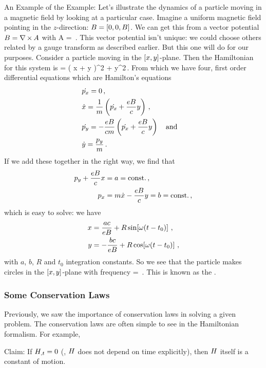 An Example of the Example: Let's illustrate the dynamics of a particle moving in a magnetic field by looking at a particular case. Imagine a uniform magnetic field pointing in the $z$-direction: $B = \left[{0,0,B}\right]$. We can get this from a vector potential $B = \nabla\operatorname{\times} A$ with
\beq
A = \,.
\eeq
This vector potential isn't unique: we could choose others related by a gauge transform as described earlier. But this one will do for our purposes. Consider a particle moving in the $\left[{x,y}\right]$-plane. Then the Hamiltonian for this system is
\beq
\ham = \left( \gmom x + y \right)^2 + \gmom y^2\,.
\eeq
From which we have four, first order differential equations which are Hamilton's equations
\begin{align*}
&\dot{{p}_{x}} = 0\,,\\
&\dot{x} = \dfrac{1}{m}\left( \dot{{p}_{x}} + \dfrac{eB}{c} y \right)\,,\\
&\dot{{p}_{y}} = -\dfrac{eB}{cm}\left( \dot{{p}_{x}} + \dfrac{eB}{c} y \right)\quad\text{and}\quad\\
&\dot{y} = \dfrac{{p}_{y}}{m}\,.
\end{align*}
If we add these together in the right way, we find that
\begin{align*}
{p}_{y} + \dfrac{eB}{c}x &= a = \text{const.}\,,\\
{p}_{x} &= m\dot{x} - \dfrac{eB}{c}y = b = \text{const.}\,,
\end{align*}
which is easy to solve: we have
\begin{align*}
x &=  \dfrac{ac}{eB} + R\sin\!\left[{\omega(t - t_0)}\right]\,,\\
y &= -\dfrac{bc}{eB} + R\cos\!\left[{\omega(t - t_0)}\right]\,,
\end{align*}
with $a$, $b$, $R$ and $t_0$ integration constants. So we see that the particle makes circles in the $\left[{x, y}\right]$-plane with frequency
\beq
\omega = \,.
\eeq
This is known as the .


\subsubsection{Some Conservation Laws}
Previously, we saw the importance of conservation laws in solving a given problem. The conservation laws are often simple to see in the Hamiltonian formalism. For example,

Claim: If ${H}_{,{t}} = 0$ (\ie, $H$ does not depend on time explicitly), then $H$ itself is a constant of motion.

